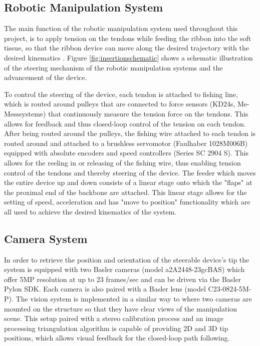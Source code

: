 \subsection{Robotic Manipulation System}



The main function of the robotic manipulation system used throughout this project, is to apply tension on the tendons while feeding the ribbon into the soft tissue, so that the ribbon device can move along the desired trajectory with the desired kinematics \cite{noseda_flat_2024}. Figure \ref{fig:insertionschematic} shows a schematic illustration of the steering mechanism of the robotic manipulation systems and the advancement of the device. 

To control the steering of the device, each tendon is attached to fishing line, which is routed around pulleys that are connected to force sensors (KD24s, Me-Messsysteme) that continuously measure the tension force on the tendons. This allows for feedback and thus closed-loop control of the tension on each tendon. After being routed around the pulleys, the fishing wire attached to each tendon is routed around and attached to a brushless servomotor (Faulhaber 1028M006B) equipped with absolute encoders and speed controllers (Series SC 2904 S). This allows for the reeling in or releasing of the fishing wire, thus enabling tension control of the tendons and thereby steering of the device. 
\newline \newline
The feeder which moves the entire device up and down consists of a linear stage onto which the "flaps" at the proximal end of the backbone are attached. This linear stage allows for the setting of speed, acceleration and has "move to position" functionality which are all used to achieve the desired kinematics of the system.


\subsection{Camera System}
In order to retrieve the position and orientation of the steerable device's tip the system is equipped with two Basler cameras (model a2A2448-23gcBAS) which offer 5MP resolution at up to 23 frames/sec and can be driven via the Basler Pylon SDK. Each camera is also paired with a Basler lens (model C23-0824-5M-P). The vision system is implemented in a similar way to \cite{dalvand_high_2016} where two cameras are mounted on the structure so that they have clear views of the manipulation scene. This setup paired with a stereo calibration process and an image processing triangulation algorithm is capable of providing 2D and 3D tip positions, which allows visual feedback for the closed-loop path following.

